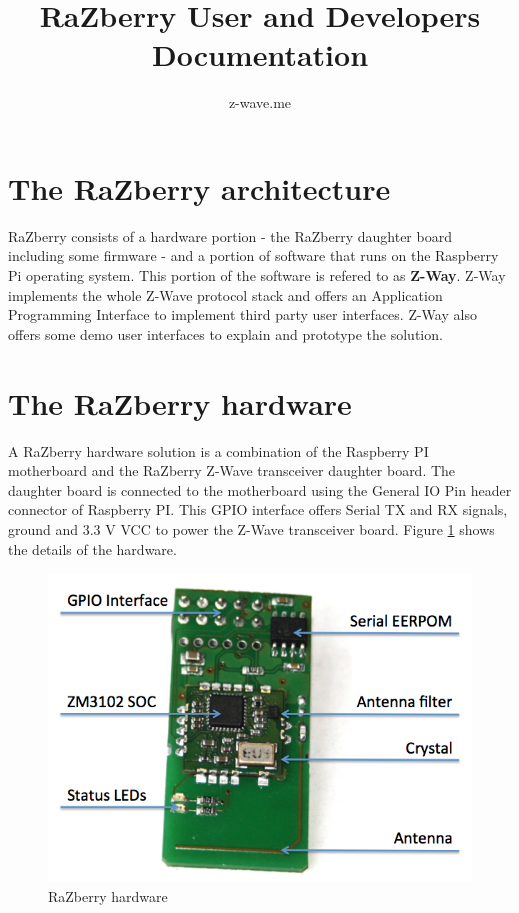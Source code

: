 \documentclass[10pt]{article}
\title{RaZberry User and Developers Documentation}
\author{z-wave.me}
\date{}
\begin{document}
\maketitle
\tableofcontents


\section{The RaZberry architecture}

RaZberry consists of a hardware portion  - the RaZberry  daughter board including some firmware - 
and  a portion of software that runs on the Raspberry Pi operating system. This portion of the 
software is refered to as {\bf Z-Way}.
Z-Way implements the whole Z-Wave protocol stack and offers an Application Programming Interface to implement 
third party user interfaces. Z-Way also offers some demo user interfaces to explain and prototype the solution.

\section{The RaZberry hardware}

A RaZberry hardware solution is a combination of the Raspberry PI motherboard and the RaZberry Z-Wave 
transceiver daughter board. The daughter board is connected to the motherboard using the General
IO Pin header connector of Raspberry PI. This GPIO interface offers Serial TX and RX signals, 
ground and 3.3 V VCC to power the Z-Wave transceiver board. Figure \ref{razberryboard} shows the details of the hardware.

\begin{figure} 
\begin{center}
\includegraphics[scale=0.5]{pics/board.png}
\caption{RaZberry hardware}
\label{razberryboard} 
\end{center} 
\end{figure}
\end{document}
